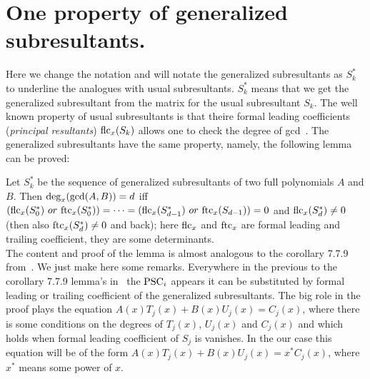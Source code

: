 \documentclass[12pt,fullpage]{article}
\newcommand{\dg}{{\rm deg}_x}
\newcommand{\tdg}{{\rm trailDeg}_x}
\newcommand{\lc}{{\rm lc}_x}
\newcommand{\flc}{{\rm flc}_x}
\newcommand{\ftc}{{\rm ftc}_x}
\newcommand{\res}{{\rm res}_x}
\newcommand{\tc}{{\rm tc}_x}
\begin{document}
\section{One property of generalized subresultants.}
Here we change the notation and will notate the generalized subresultants as $S_k^*$ to 
underline the analogues with usual subresultants.
$S_k^*$ means that we get the generalized subresultant from the matrix for the usual
subresultant $S_k$.
The well known property of usual subresultants is that theire formal leading
coefficients ({\it principal resultants}) $\flc(S_k)$ allows one to check the
degree of gcd~\cite{Mishra}.
 The generalized subresultants have the same property, namely,
the following lemma can be proved:

{Let $S_k^*$ be the sequence of generalized subresultants of two full polynomials
$A$ and $B$. Then $\dg(\gcd(A,B))=d$ iff $(\flc(S_0^*)\ or\ \ftc(S_0^*))=\cdots=
(\flc(S_{d-1}^*)\ or\ \ftc(S_{d-1}))=0$ and $\flc(S_d^*)\ne 0$ (then also 
$\ftc(S_d^*)\ne 0$ and back); here $\flc$ and $\ftc$ are formal leading and
trailing coefficient, they are some determinants.}\\
The content and proof of the lemma is almost analogous to the corollary 7.7.9 
from~\cite{Mishra}. We just make here some remarks.
Everywhere in the previous to the corollary 7.7.9 lemma's
in~\cite{Mishra} the ${\rm PSC}_i$ appears it can be substituted by
formal leading or trailing coefficient of the generalized subresultants.
The big role in the proof plays the equation $A(x)T_j(x)+B(x)U_j(x)=C_j(x)$,
where there is some conditions on the degrees of $T_j(x)$, $U_j(x)$ and $C_j(x)$ and
which holds when formal leading coefficient of $S_j$ is vanishes.
In the our case this equation will be of the form
$A(x)T_j(x)+B(x)U_j(x)=x^*C_j(x)$, where $x^*$ means some power of $x$.


\end{document}
